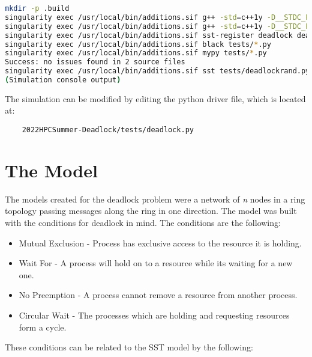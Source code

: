 \documentclass{article}
\begin{document}
\begin{lstlisting}[language=bash, frame=none]
mkdir -p .build
singularity exec /usr/local/bin/additions.sif g++ -std=c++1y -D__STDC_FORMAT_MACROS -fPIC -DHAVE_CONFIG_H -I/opt/SST/11.1.0/include -MMD -c node.cc -o .build/node.o
singularity exec /usr/local/bin/additions.sif g++ -std=c++1y -D__STDC_FORMAT_MACROS -fPIC -DHAVE_CONFIG_H -I/opt/SST/11.1.0/include -shared -fno-common -Wl,-undefined -Wl,dynamic_lookup -o libdeadlock.so .build/node.o
singularity exec /usr/local/bin/additions.sif sst-register deadlock deadlock_LIBDIR=/home/{USER}/sst-work/2022HPCSummer-Deadlock/deadlock
singularity exec /usr/local/bin/additions.sif black tests/*.py
singularity exec /usr/local/bin/additions.sif mypy tests/*.py
Success: no issues found in 2 source files
singularity exec /usr/local/bin/additions.sif sst tests/deadlockrand.py
(Simulation console output)
\end{lstlisting}

\noindent The simulation can be modified by editing the python driver file, which is located at:

\begin{verbatim}
	2022HPCSummer-Deadlock/tests/deadlock.py
\end{verbatim}

\section{The Model}
\label{sst_model}
The models created for the deadlock problem were a network of \textit{n} nodes in a ring topology passing messages along the ring in one direction. The model was built with the conditions for deadlock in mind. The conditions are the following\cite[p. 70]{1971_Coffman}:

\begin{itemize}
	\label{list:conditions}
	\item Mutual Exclusion - Process has exclusive access to the resource it is holding.
	\item Wait For - A process will hold on to a resource while its waiting for a new one.
	\item No Preemption - A process cannot remove a resource from another process.
	\item Circular Wait - The processes which are holding and requesting resources form a cycle. \newline
\end{itemize}

These conditions can be related to the SST model by the following:
\end{document}
